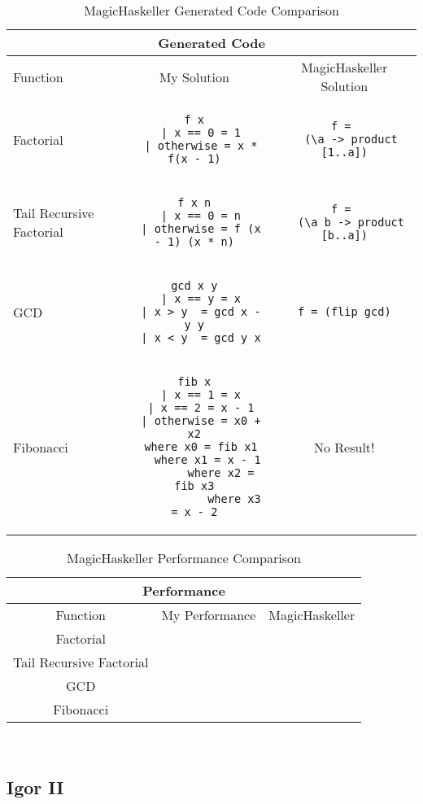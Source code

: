 \begin{table}[h!]
\centering
\begin{tabular}{| m{4em} | c | c |}
\hline
\multicolumn{3}{|c|}{\textbf{Generated Code}} \\
\hline
Function & My Solution & MagicHaskeller Solution \\
\hline
Factorial 
&
\begin{lstlisting}
f x
  | x == 0 = 1
  | otherwise = x * f(x - 1)
\end{lstlisting}
& 
\begin{lstlisting}
f = 
  (\a -> product [1..a])
\end{lstlisting}
\\
\hline
\mbox{}\newline
Tail \newline
Recursive \newline
Factorial \newline
&
\begin{lstlisting}
f x n
  | x == 0 = n
  | otherwise = f (x - 1) (x * n)
\end{lstlisting}
& 
\begin{lstlisting}
f = 
  (\a b -> product [b..a])
\end{lstlisting}
\\
\hline
GCD 
&
\begin{lstlisting}
gcd x y
  | x == y = x
  | x > y  = gcd x - y y
  | x < y  = gcd y x
\end{lstlisting}	
&
\begin{lstlisting}
f = (flip gcd)
\end{lstlisting}
\\
\hline
Fibonacci
&
\begin{lstlisting}
fib x
  | x == 1 = x
  | x == 2 = x - 1
  | otherwise = x0 + x2
  where x0 = fib x1
  	where x1 = x - 1
  		where x2 = fib x3
  			where x3 = x - 2
\end{lstlisting}
&
No Result!
\\
\hline
\end{tabular}
\caption{MagicHaskeller Generated Code Comparison }
\label{table:1}
\end{table}

\begin{table}[h!]
\centering
\begin{tabular}{|c|c|c|}
\hline
\multicolumn{3}{|c|}{\textbf{Performance}}\\
\hline
Function & My Performance & MagicHaskeller \\
\hline
Factorial & & \\
\hline
Tail Recursive Factorial & & \\
\hline
GCD & & \\
\hline
Fibonacci & & \\
\hline
\end{tabular}
\caption{MagicHaskeller Performance Comparison }
\label{table:2}
\end{table}
\mbox{} \\

\subsection{Igor II}


\pagebreak
%
%